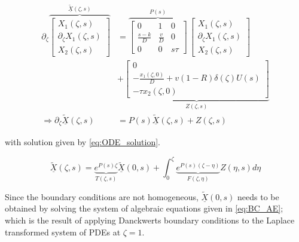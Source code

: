     \begin{equation} \label{eq:laplace_transformed}
    \begin{aligned}
        \partial_\zeta \overbrace{\begin{bmatrix}
            X_1(\zeta,s)\\ \partial_\zeta X_1(\zeta,s)\\ X_2(\zeta,s)
        \end{bmatrix}}^{\underline{\tilde{X}}(\zeta,s)} &= \overbrace{\begin{bmatrix}
            0 & 1 & 0\\
            \frac{s-k}{D} & \frac{v}{D} & 0\\
            0 & 0 & s\tau
            \end{bmatrix}}^{P(s)} \, \begin{bmatrix}
                X_1(\zeta,s)\\ \partial_\zeta X_1(\zeta,s)\\ X_2(\zeta,s)
            \end{bmatrix} \\
            &+ \underbrace{\begin{bmatrix}
                0\\ -\frac{x_1(\zeta,0)}{D} + v(1-R) \delta(\zeta) U(s)\\ -\tau x_2(\zeta,0)
            \end{bmatrix}}_{Z(\zeta,s)} \\
            \Rightarrow \partial_\zeta \underline{\tilde{X}}(\zeta,s) &= P(s) \underline{\tilde{X}}(\zeta,s) + Z(\zeta,s)
    \end{aligned}
    \end{equation} 
    
    with solution given by \eqref{eq:ODE_solution}.
    
    \begin{equation} \label{eq:ODE_solution}
        \underline{\tilde{X}}(\zeta,s) = \underbrace{e^{P(s)\zeta}}_{T(\zeta,s)} \underline{\tilde{X}}(0,s) + \int_0^\zeta \underbrace{e^{P(s)(\zeta - \eta)}}_{F(\zeta, \eta)} Z(\eta,s) d\eta
    \end{equation}
    
    Since the boundary conditions are not homogeneous, $\underline{\tilde{X}}(0,s)$ needs to be obtained by solving the system of algebraic equations given in \eqref{eq:BC_AE}; which is the result of applying Danckwerts boundary conditions to the Laplace transformed system of PDEs at $\zeta = 1$.
    
